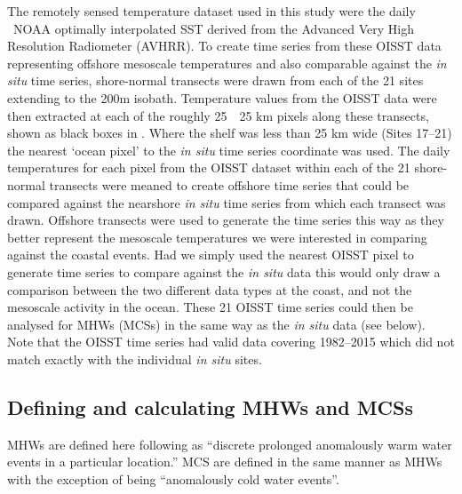 \documentclass[a4paper,10pt,review]{elsarticle}
\begin{document}
The remotely sensed temperature dataset used in this study were the daily \degree~NOAA optimally interpolated SST \citep[OISST;][]{Reynolds2007} derived from the Advanced Very High Resolution Radiometer (AVHRR). To create time series from these OISST data representing offshore mesoscale temperatures and also comparable against the \emph{in situ} time series, shore-normal transects were drawn from each of the 21 sites extending to the 200m isobath. Temperature values from the OISST data were then extracted at each of the roughly 25~\texttimes~25 km pixels along these transects, shown as black boxes in . Where the shelf was less than 25 km wide (Sites 17--21) the nearest `ocean pixel' to the \emph{in situ} time series coordinate was used. The daily temperatures for each pixel from the OISST dataset within each of the 21 shore-normal transects were meaned to create offshore time series that could be compared against the nearshore \emph{in situ} time series from which each transect was drawn. Offshore transects were used to generate the time series this way as they better represent the mesoscale temperatures we were interested in comparing against the coastal events. Had we simply used the nearest OISST pixel to generate time series to compare against the \emph{in situ} data this would only draw a comparison between the two different data types at the coast, and not the mesoscale activity in the ocean. These 21 OISST time series could then be analysed for MHWs (MCSs) in the same way as the \emph{in situ} data (see below). Note that the OISST time series had valid data covering 1982--2015 which did not match exactly with the individual \emph{in situ} sites.

\subsection{Defining and calculating MHWs and MCSs}
MHWs are defined here following \citet{Hobday2016} as ``discrete prolonged anomalously warm water events in a particular location.'' MCS are defined in the same manner as MHWs with the exception of being ``anomalously cold water events''.
\end{document}

